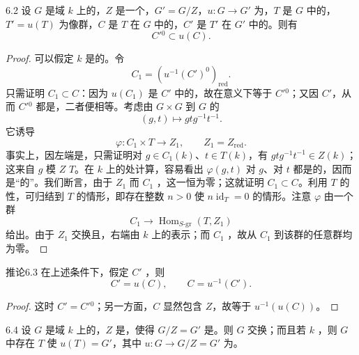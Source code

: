 \begin{SGAresult}{}{6.2}
设 $G$ 是域 $k$ 上的，$Z$ 是一个，$G'=G/Z$，$u:G\to G'$ 为，$T$ 是 $G$ 中的，$T'=u(T)$ 为像群，$C$ 是 $T$ 在 $G$ 中的，$C'$ 是 $T'$ 在 $G'$ 中的。则有
\[
C'{}^0\subset u(C).
\]
\end{SGAresult}
\begin{proof}
可以假定 $k$ 是的。令
\[
C_1=(u^{-1}(C')^0)_{\mathrm{red}}.
\]
只需证明 $C_1\subset C$：因为 $u(C_1)$ 是 $C'$ 中的，故在意义下等于 $C'{}^0$；又因 $C'$，从而 $C'{}^0$ 都是，二者便相等。考虑由 $G\times G$ 到 $G$ 的
\[
(g,t)\longmapsto gtg^{-1}t^{-1}.
\]
它诱导
\[
\varphi:C_1\times T\longrightarrow Z_1,\qquad Z_1=Z_{\mathrm{red}}.
\]
事实上，因左端是，只需证明对 $g\in C_1(k)$、$t\in T(k)$，有 $gtg^{-1}t^{-1}\in Z(k)$；这来自 $g$ 模 $Z$  $T$。在 $k$ 上的处计算，容易看出 $\varphi(g,t)$ 对 $g$、对 $t$ 都是的，因而是“的”。我们断言，由于 $Z_1$ 而 $C_1$ ，这一恒为零；这就证明 $C_1\subset C$。利用 $T$ 的性，可归结到 $T$ 的情形，即存在整数 $n>0$ 使 $n\operatorname{id}_T=0$ 的情形。注意 $\varphi$ 由一个群
\[
C_1\longrightarrow\operatorname{Hom}_{S\text{-gr}}(T,Z_1)
\]
给出。由于 $Z_1$ 交换且，右端由 $k$ 上的表示；而 $C_1$ ，故从 $C_1$ 到该群的任意群均为零。
\end{proof}
\begin{SGAresult}{推论}{6.3}
在上述条件下，假定 $C'$ ，则
\[
C'=u(C),\qquad C=u^{-1}(C').
\]
\end{SGAresult}
\begin{proof}
这时 $C'=C'{}^0$；另一方面，$C$ 显然包含 $Z$，故等于 $u^{-1}(u(C))$。
\end{proof}
\begin{SGAresult}{}{6.4}
设 $G$ 是域 $k$ 上的，$Z$ 是，使得 $G/Z=G'$ 是。则 $G$ 交换；而且若 $k$ ，则 $G$ 中存在 $T$ 使 $u(T)=G'$，其中 $u:G\to G/Z=G'$ 为。
\end{SGAresult}
